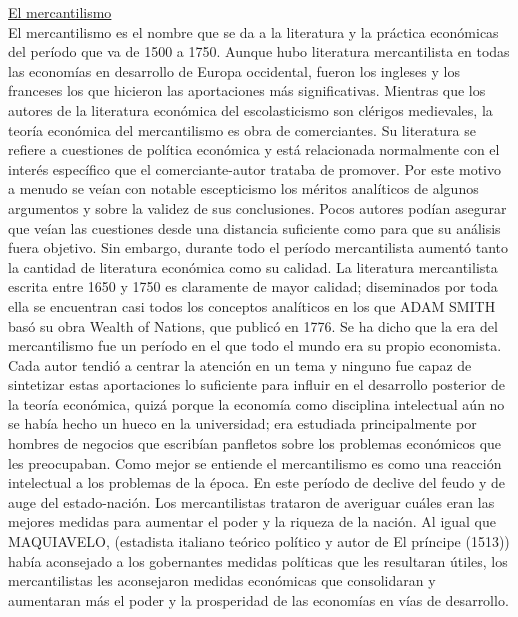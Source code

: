\documentclass[10pt,a4paper]{article}
\begin{document}
\underline{El mercantilismo}\\
El mercantilismo es el nombre que se da a la literatura y la práctica económicas del período que va de 1500 a 1750. Aunque hubo literatura mercantilista en todas las economías en desarrollo de Europa occidental, fueron los ingleses y los franceses los que hicieron las aportaciones más significativas.
Mientras que los autores de la literatura económica del escolasticismo son clérigos medievales, la teoría económica del mercantilismo es obra de comerciantes. Su literatura se refiere a cuestiones de política económica y está relacionada normalmente con el interés específico que el comerciante-autor trataba de promover. Por este motivo a menudo se veían con notable escepticismo los méritos analíticos de algunos argumentos y sobre la validez de sus conclusiones. Pocos autores podían asegurar que veían las cuestiones desde una distancia suficiente como para que su análisis fuera objetivo. Sin embargo, durante todo el período mercantilista aumentó tanto la cantidad de literatura económica como su calidad. La literatura mercantilista escrita entre 1650 y 1750 es claramente de mayor calidad; diseminados por toda ella se encuentran casi todos los conceptos analíticos en los que ADAM SMITH basó su obra Wealth of Nations, que publicó en 1776.
Se ha dicho que la era del mercantilismo fue un período en el que todo el mundo era su propio economista. Cada autor tendió a centrar la atención en un tema y ninguno fue capaz de sintetizar estas aportaciones lo suficiente para influir en el desarrollo posterior de la teoría económica, quizá porque la economía como disciplina intelectual aún no se había hecho un hueco en la universidad; era estudiada principalmente por hombres de negocios que escribían panfletos sobre los problemas económicos que les preocupaban.
Como mejor se entiende el mercantilismo es como una reacción intelectual a los problemas de la época. En este período de declive del feudo y de auge del estado-nación. Los mercantilistas trataron de averiguar cuáles eran las mejores medidas para aumentar el poder y la riqueza de la nación. Al igual que MAQUIAVELO, (estadista italiano teórico político y autor de El príncipe (1513)) había aconsejado a los gobernantes medidas políticas que les resultaran útiles, los mercantilistas les aconsejaron medidas económicas que consolidaran y aumentaran más el poder y la prosperidad de las economías en vías de desarrollo.
\end{document}
